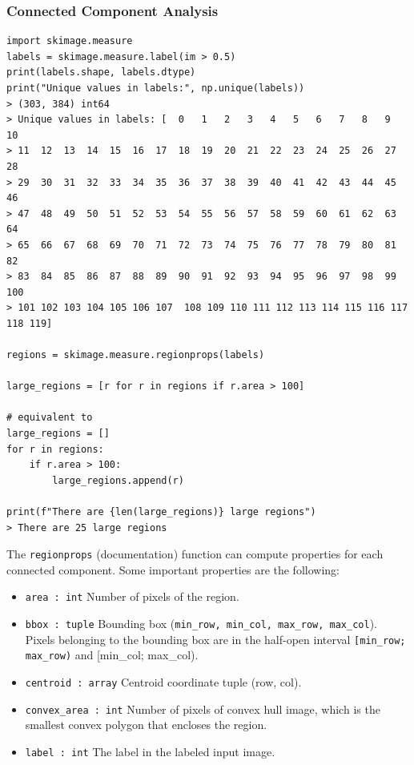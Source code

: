 \documentclass[x11names,11pt,a4paper]{article}
\theoremstyle{definition}
\begin{document}
\subsubsection{Connected Component Analysis}
\begin{verbatim}
import skimage.measure
labels = skimage.measure.label(im > 0.5)
print(labels.shape, labels.dtype)
print("Unique values in labels:", np.unique(labels))
> (303, 384) int64
> Unique values in labels: [  0   1   2   3   4   5   6   7   8   9  10
> 11  12  13  14  15  16  17  18  19  20  21  22  23  24  25  26  27  28
> 29  30  31  32  33  34  35  36  37  38  39  40  41  42  43  44  45  46
> 47  48  49  50  51  52  53  54  55  56  57  58  59  60  61  62  63  64
> 65  66  67  68  69  70  71  72  73  74  75  76  77  78  79  80  81  82
> 83  84  85  86  87  88  89  90  91  92  93  94  95  96  97  98  99 100
> 101 102 103 104 105 106 107  108 109 110 111 112 113 114 115 116 117 118 119]

regions = skimage.measure.regionprops(labels)

large_regions = [r for r in regions if r.area > 100]

# equivalent to
large_regions = []
for r in regions:
	if r.area > 100:
		large_regions.append(r)

print(f"There are {len(large_regions)} large regions")
> There are 25 large regions
\end{verbatim}
\noindent
The \texttt{regionprops} (documentation) function can compute properties for each connected component. Some important properties are the following:
\begin{itemize}[label=,nosep,leftmargin=*, labelindent=0.5cm]
	\item \texttt{area : int} Number of pixels of the region.
	\item \texttt{bbox : tuple} Bounding box (\texttt{min\_row, min\_col, max\_row, max\_col}). Pixels belonging to the bounding box are in the half-open interval \texttt{[min\_row; max\_row)} and [min\_col; max\_col).
	\item \texttt{centroid : array} Centroid coordinate tuple (row, col).
	\item \texttt{convex_area : int} Number of pixels of convex hull image, which is the smallest convex polygon that encloses the region.
	\item \texttt{label : int} The label in the labeled input image.
\end{itemize}
\end{document}
